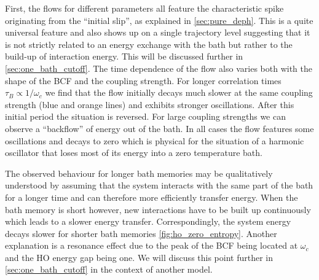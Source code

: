 First, the flows for different parameters all feature the
characteristic spike originating from the ``initial slip'', as
explained in \cref{sec:pure_deph}. This is a quite universal feature
and also shows up on a single trajectory level suggesting that it is
not strictly related to an energy exchange with the bath but rather to
the build-up of interaction energy. This will be discussed further in
\cref{sec:one_bath_cutoff}. The time dependence of the flow also
varies both with the shape of the BCF and the coupling strength. For
longer correlation times \(τ_{B}\propto 1/ω_c\) we find that the flow
initially decays much slower at the same coupling strength (blue and
orange lines) and exhibits stronger oscillations. After this initial
period the situation is reversed. For large coupling strengths we can
observe a ``backflow'' of energy out of the bath. In all cases the
flow features some oscillations and decays to zero which is physical
for the situation of a harmonic oscillator that loses most of its
energy into a zero temperature bath.

The observed behaviour for longer bath memories may be qualitatively
understood by assuming that the system interacts with the same part of
the bath for a longer time and can therefore more efficiently transfer
energy. When the bath memory is short however, new interactions have
to be built up continuously which leads to a slower energy
transfer. Correspondingly, the system energy decays slower for shorter
bath memories \cref{fig:ho_zero_entropy}. Another explanation is a
resonance effect due to the peak of the BCF being located at \(ω_c\)
and the HO energy gap being one. We will discuss this point further in
\cref{sec:one_bath_cutoff} in the context of another model.

